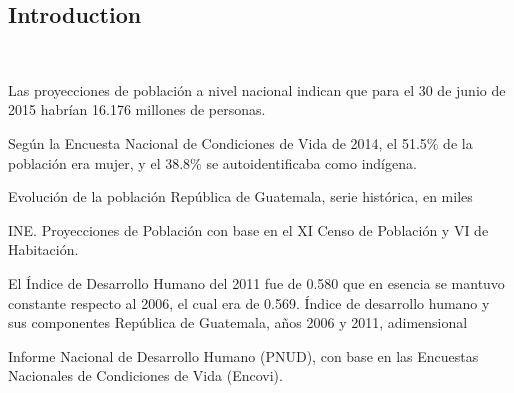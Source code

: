 \begin{center}
\section*{\fontsize{20}{25}\selectfont Introduction}
\end{center}
$\ $ \\[-5cm]

{%
Las proyecciones de población a nivel nacional indican que para el 30 de junio de 2015 habrían 16.176 millones de personas.

Según la Encuesta Nacional de Condiciones de Vida de 2014, el 51.5\% de la población era mujer, y el 38.8\% se autoidentificaba como indígena. }%
{%
 Evolución de la población} %
{%
 República de Guatemala, serie histórica, en miles} %
{%
 \begin{tikzpicture}[x=1pt,y=1pt]    \end{tikzpicture}}%
{INE. Proyecciones de Población con base en el XI Censo de Población y VI de Habitación.} %





%
{%
	El Índice de Desarrollo Humano del 2011 fue de 0.580 que en esencia se mantuvo constante respecto al 2006, el cual era de 0.569.}%
{%
	Índice de desarrollo humano y sus componentes} %
{%
	República de Guatemala, años 2006 y 2011, adimensional} %
{%
	\begin{tikzpicture}[x=1pt,y=1pt]    \end{tikzpicture}}%
{%
	Informe Nacional de Desarrollo Humano (PNUD), con base en las Encuestas Nacionales de Condiciones de Vida (Encovi).} %




